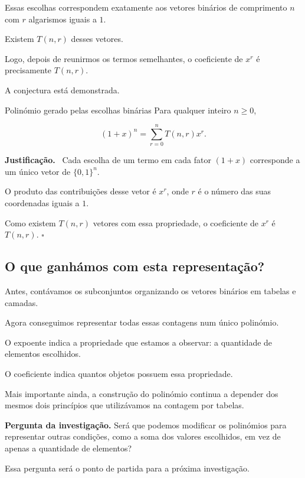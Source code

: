 \documentclass[11pt,a4paper,oneside]{book}
\newcommand{\Pergunta}[1]{\begin{perguntabox}\textbf{Pergunta da investigação.} #1\end{perguntabox}}
\newcommand{\prova}{\textbf{Justificação.}\ }
\newcommand{\fimprova}{\hfill$\square$}
\begin{document}
Essas escolhas correspondem exatamente
aos vetores binários de comprimento $n$
com $r$ algarismos iguais a $1$.

Existem $T(n,r)$ desses vetores.

Logo, depois de reunirmos os termos
semelhantes, o coeficiente de $x^r$
é precisamente $T(n,r)$.

A conjectura está demonstrada.

\begin{teoremabox}{Polinómio gerado pelas escolhas binárias}
Para qualquer inteiro $n\geq0$,

\[
\boxed{
(1+x)^n=\sum_{r=0}^{n}T(n,r)x^r
}.
\]

\prova
Cada escolha de um termo em cada fator
$(1+x)$ corresponde a um único vetor
de $\{0,1\}^n$.

O produto das contribuições desse vetor
é $x^r$, onde $r$ é o número das suas
coordenadas iguais a $1$.

Como existem $T(n,r)$ vetores com essa
propriedade, o coeficiente de $x^r$
é $T(n,r)$.
\fimprova
\end{teoremabox}

\subsection*{O que ganhámos com esta representação?}

Antes, contávamos os subconjuntos
organizando os vetores binários
em tabelas e camadas.

Agora conseguimos representar todas
essas contagens num único polinómio.

O expoente indica a propriedade
que estamos a observar:
a quantidade de elementos escolhidos.

O coeficiente indica quantos objetos
possuem essa propriedade.

Mais importante ainda, a construção
do polinómio continua a depender dos
mesmos dois princípios que utilizávamos
na contagem por tabelas.

\Pergunta{Será que podemos modificar os
polinómios para representar outras condições,
como a soma dos valores escolhidos, em vez
de apenas a quantidade de elementos?}

Essa pergunta será o ponto de partida
para a próxima investigação.
\end{document}
